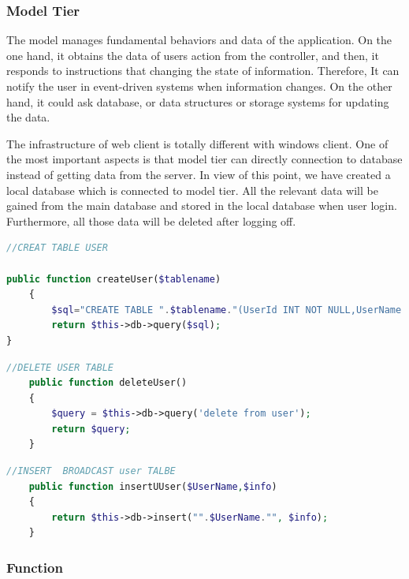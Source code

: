 \documentclass[a4paper,11pt]{article}
\begin{document}
\subsubsection*{Model Tier}
The model manages fundamental behaviors and data of the application. On the one hand, it obtains the data of users action from the controller, and then, it responds to instructions that changing the state of information. Therefore, It can notify the user in event-driven systems when information changes. On the other hand, it could ask database, or data structures or storage systems for updating the data.

The infrastructure of web client is totally different with windows client. One of the most important aspects is that model tier can directly connection to database instead of getting data from the server. In view of this point, we have created a local database which is connected to model tier. All the relevant data will be gained from the main database and stored in the local database when user login. Furthermore, all those data will be deleted after logging off. 

\begin{lstlisting}[language=php]
//CREAT TABLE USER

public function createUser($tablename)
    {
        $sql="CREATE TABLE ".$tablename."(UserId INT NOT NULL,UserName VARCHAR (255) NOT NULL,PIN  VARCHAR(255) NOT NULL,profile  CHAR (255), Ip CHAR(255), PRIMARY KEY (UserId));";
        return $this->db->query($sql);
}
\end{lstlisting}
\begin{lstlisting}[language=php]
//DELETE USER TABLE
    public function deleteUser()
    {
        $query = $this->db->query('delete from user');
        return $query;
    }
\end{lstlisting}
\begin{lstlisting}[language=php]
//INSERT  BROADCAST user TALBE
    public function insertUUser($UserName,$info)
    {
        return $this->db->insert("".$UserName."", $info);
    }
\end{lstlisting}

\subsubsection{Function}
\end{document}
